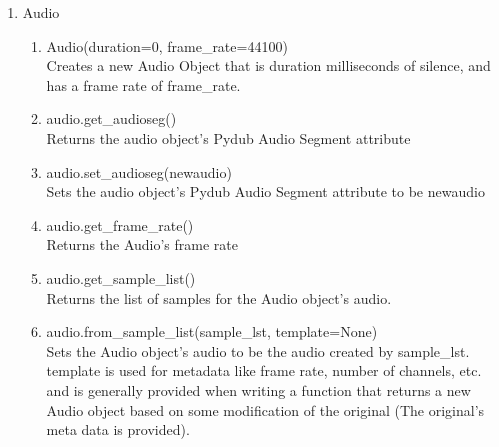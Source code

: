 \documentclass[11pt, letterpaper, onecolumn, oneside, final]{article}
\begin{document}
\maketitle


\begin{enumerate}
\item Audio
    \begin{enumerate}
        \item {\consolas Audio(duration=0, frame\_rate=44100)} \\
        \hspace*{8mm}Creates a new Audio Object that is {\consolas duration} milliseconds of silence, and has a 
        \hspace*{8mm}frame rate of {\consolas frame\_rate}.
         
        \item {\consolas audio.get\_audioseg()} \\ 
        \hspace*{8mm}Returns the audio object's Pydub Audio Segment attribute
        
        \item {\consolas audio.set\_audioseg(newaudio)} \\
        \hspace*{8mm}Sets the audio object's Pydub Audio Segment attribute to be {\consolas newaudio}
        
        \item {\consolas audio.get\_frame\_rate()} \\ 
        \hspace*{8mm}Returns the Audio's frame rate
        
        \item {\consolas audio.get\_sample\_list()} \\
        \hspace*{8mm}Returns the list of samples for the Audio object's audio.
        
        \item {\consolas audio.from\_sample\_list(sample\_lst, template=None)} \\
        \hspace*{8mm}Sets the Audio object's audio to be the audio created by {\consolas sample\_lst}. {\consolas template} 
        \hspace*{8mm}is used for metadata like frame rate, number of channels, etc. and is generally 
        \hspace*{8mm}provided when writing a function that returns a new Audio object based on some 
        \hspace*{8mm}modification of the original (The original's meta data is provided).
        

\end{enumerate}
\end{enumerate}
\end{document}
